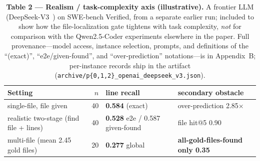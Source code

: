 \documentclass[11pt]{article}
\newcommand{\code}[1]{\texttt{#1}}
\begin{document}
\begin{table}[t]
\centering\small
\caption*{\textbf{Table 2 --- Realism / task-complexity axis (illustrative).} A frontier LLM (DeepSeek-V3~\citep{deepseekv3}) on SWE-bench Verified, from a separate earlier run; included to show how the file-localization gate tightens with task complexity, \emph{not} for comparison with the Qwen2.5-Coder experiments elsewhere in the paper. Full provenance---model access, instance selection, prompts, and definitions of the ``(exact)'', ``e2e/given-found'', and ``over-prediction'' notations---is in Appendix~B; per-instance records ship in the artifact (\code{archive/p\{0,1,2\}\_openai\_deepseek\_v3.json}).}
\setlength{\tabcolsep}{6pt}
\begin{tabular}{lrll}
\toprule
Setting & $n$ & line recall & secondary obstacle \\
\midrule
single-file, file given & 40 & \textbf{0.584} (exact) & over-prediction 2.85$\times$ \\
realistic two-stage (find file + lines) & 40 & \textbf{0.528} e2e / 0.587 given-found & file hit@5 0.90 \\
multi-file (mean 2.45 gold files) & 20 & \textbf{0.277} global & \textbf{all-gold-files-found only 0.35} \\
\bottomrule
\end{tabular}
\end{table}
\end{document}
